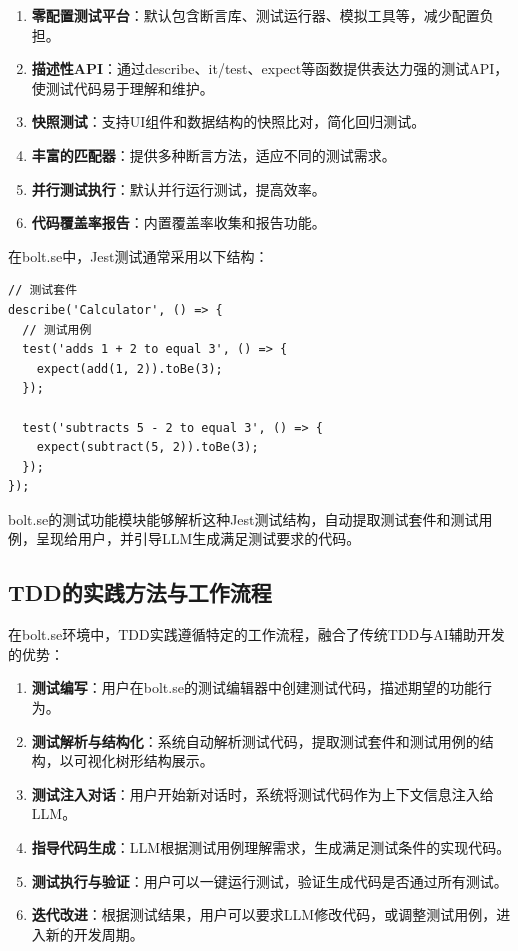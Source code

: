 \begin{enumerate}
  \item \textbf{零配置测试平台}：默认包含断言库、测试运行器、模拟工具等，减少配置负担。
  
  \item \textbf{描述性API}：通过describe、it/test、expect等函数提供表达力强的测试API，使测试代码易于理解和维护。
  
  \item \textbf{快照测试}：支持UI组件和数据结构的快照比对，简化回归测试。
  
  \item \textbf{丰富的匹配器}：提供多种断言方法，适应不同的测试需求。
  
  \item \textbf{并行测试执行}：默认并行运行测试，提高效率。
  
  \item \textbf{代码覆盖率报告}：内置覆盖率收集和报告功能。
\end{enumerate}

在bolt.se中，Jest测试通常采用以下结构：

\begin{verbatim}
// 测试套件
describe('Calculator', () => {
  // 测试用例
  test('adds 1 + 2 to equal 3', () => {
    expect(add(1, 2)).toBe(3);
  });
  
  test('subtracts 5 - 2 to equal 3', () => {
    expect(subtract(5, 2)).toBe(3);
  });
});
\end{verbatim}

bolt.se的测试功能模块能够解析这种Jest测试结构，自动提取测试套件和测试用例，呈现给用户，并引导LLM生成满足测试要求的代码。

\subsection{TDD的实践方法与工作流程}

在bolt.se环境中，TDD实践遵循特定的工作流程，融合了传统TDD与AI辅助开发的优势：

\begin{enumerate}
  \item \textbf{测试编写}：用户在bolt.se的测试编辑器中创建测试代码，描述期望的功能行为。
  
  \item \textbf{测试解析与结构化}：系统自动解析测试代码，提取测试套件和测试用例的结构，以可视化树形结构展示。
  
  \item \textbf{测试注入对话}：用户开始新对话时，系统将测试代码作为上下文信息注入给LLM。
  
  \item \textbf{指导代码生成}：LLM根据测试用例理解需求，生成满足测试条件的实现代码。
  
  \item \textbf{测试执行与验证}：用户可以一键运行测试，验证生成代码是否通过所有测试。
  
  \item \textbf{迭代改进}：根据测试结果，用户可以要求LLM修改代码，或调整测试用例，进入新的开发周期。
\end{enumerate}

